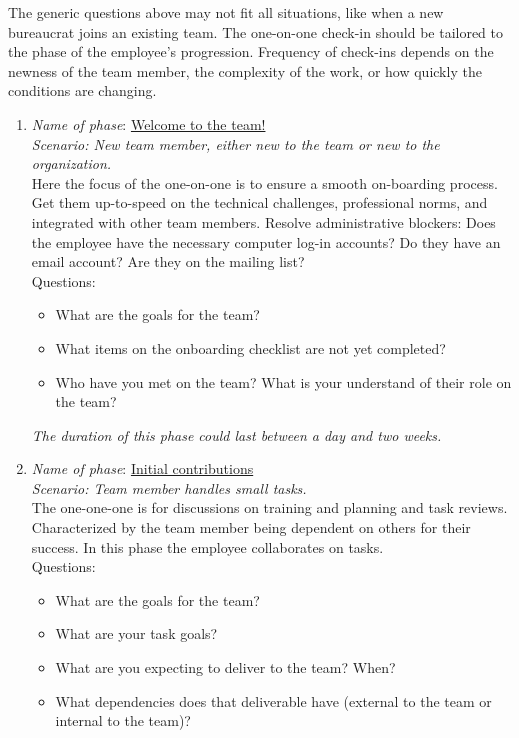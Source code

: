 The generic questions above may not fit all situations, like when a new bureaucrat joins an existing team. 
The one-on-one check-in should be tailored to the phase of the employee's progression. Frequency of check-ins depends on the newness of the team member, the complexity of the work, or how quickly the conditions are changing.
\begin{enumerate}
    \item \textit{Name of phase}: \underline{Welcome to the team!}\\
    \textit{Scenario: New team member, either new to the team or new to the organization. }\\
    Here the focus of the one-on-one is to ensure a smooth on-boarding process. Get them up-to-speed on the technical challenges, professional norms, and integrated with other team members. Resolve administrative blockers: Does the employee have the necessary computer log-in accounts? Do they have an email account? Are they on the mailing list? \\
    Questions:
    \begin{itemize}
        \item What are the goals for the team?
        \item What items on the onboarding checklist are not yet completed?
        \item Who have you met on the team? What is your understand of their role on the team?
    \end{itemize}
\textit{The duration of this phase could last between a day and two weeks.}
    \item \textit{Name of phase}: \underline{Initial contributions}\\
    \textit{Scenario: Team member handles small tasks. }\\
    The one-one-one is for discussions on training and planning and task reviews. Characterized by the team member being dependent on others for their success. In this phase the employee collaborates on tasks.\\
    Questions:
    \begin{itemize}
        \item What are the goals for the team?
        \item What are your task goals?
        \item What are you expecting to deliver to the team? When? 
        \item What dependencies does that deliverable have (external to the team or internal to the team)?

\end{itemize}
\end{enumerate}
